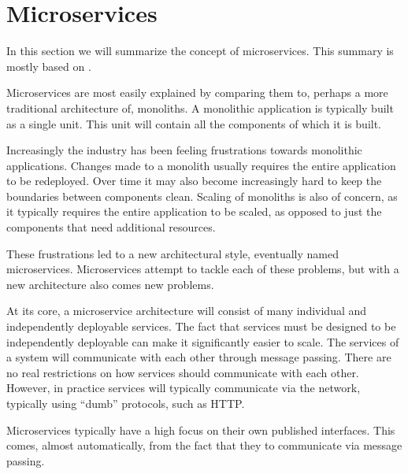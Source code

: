 \section{Microservices}

In this section we will summarize the concept of microservices. This summary is
mostly based on \autocite{MFMS}.

Microservices are most easily explained by comparing them to, perhaps a more
traditional architecture of, monoliths. A monolithic application is typically
built as a single unit. This unit will contain all the components of which it
is built.

Increasingly the industry has been feeling frustrations towards monolithic
applications.  Changes made to a monolith usually requires the entire
application to be redeployed.  Over time it may also become increasingly hard
to keep the boundaries between components clean.  Scaling of monoliths is also
of concern, as it typically requires the entire application to be scaled, as
opposed to just the components that need additional resources.

These frustrations led to a new architectural style, eventually named
microservices. Microservices attempt to tackle each of these problems, but with
a new architecture also comes new problems.

At its core, a microservice architecture will consist of many individual and
independently deployable services. The fact that services must be designed to
be independently deployable can make it significantly easier to scale.  The
services of a system will communicate with each other through message passing.
There are no real restrictions on how services should communicate with each
other. However, in practice services will typically communicate via the
network, typically using ``dumb'' protocols, such as HTTP.

Microservices typically have a high focus on their own published interfaces.
This comes, almost automatically, from the fact that they to communicate via
message passing.

